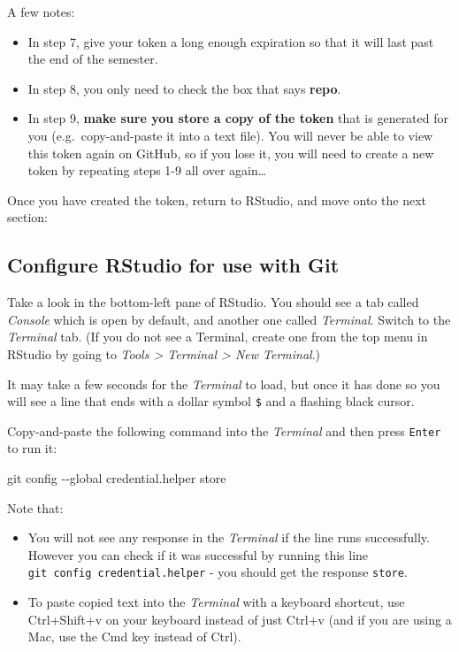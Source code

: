 \documentclass[
]{book}
\newenvironment{Shaded}{\begin{snugshade}}{\end{snugshade}}
\newcommand{\AttributeTok}[1]{\textcolor[rgb]{0.77,0.63,0.00}{#1}}
\newcommand{\FunctionTok}[1]{\textcolor[rgb]{0.00,0.00,0.00}{#1}}
\newcommand{\NormalTok}[1]{#1}
\providecommand{\tightlist}{%
  \setlength{\itemsep}{0pt}\setlength{\parskip}{0pt}}
\begin{document}
A few notes:

\begin{itemize}
\tightlist
\item
  In step 7, give your token a long enough expiration so that it will last past the end of the semester.
\item
  In step 8, you only need to check the box that says \textbf{repo}.
\item
  In step 9, \textbf{make sure you store a copy of the token} that is generated for you (e.g.~copy-and-paste it into a text file). You will never be able to view this token again on GitHub, so if you lose it, you will need to create a new token by repeating steps 1-9 all over again\ldots{}
\end{itemize}

Once you have created the token, return to RStudio, and move onto the next section:

\hypertarget{configure-rstudio-for-use-with-git}{%
\subsection{Configure RStudio for use with Git}\label{configure-rstudio-for-use-with-git}}

Take a look in the bottom-left pane of RStudio. You should see a tab called \emph{Console} which is open by default, and another one called \emph{Terminal}. Switch to the \emph{Terminal} tab. (If you do not see a Terminal, create one from the top menu in RStudio by going to \emph{Tools \textgreater{} Terminal \textgreater{} New Terminal}.)

It may take a few seconds for the \emph{Terminal} to load, but once it has done so you will see a line that ends with a dollar symbol \texttt{\$} and a flashing black cursor.

Copy-and-paste the following command into the \emph{Terminal} and then press \texttt{Enter} to run it:

\begin{Shaded}
\begin{Highlighting}[]
\FunctionTok{git}\NormalTok{ config }\AttributeTok{{-}{-}global}\NormalTok{ credential.helper store}
\end{Highlighting}
\end{Shaded}

Note that:

\begin{itemize}
\item
  You will not see any response in the \emph{Terminal} if the line runs successfully. However you can check if it was successful by running this line \texttt{git\ config\ credential.helper} - you should get the response \texttt{store}.
\item
  To paste copied text into the \emph{Terminal} with a keyboard shortcut, use Ctrl+Shift+v on your keyboard instead of just Ctrl+v (and if you are using a Mac, use the Cmd key instead of Ctrl).
\end{itemize}
\end{document}
